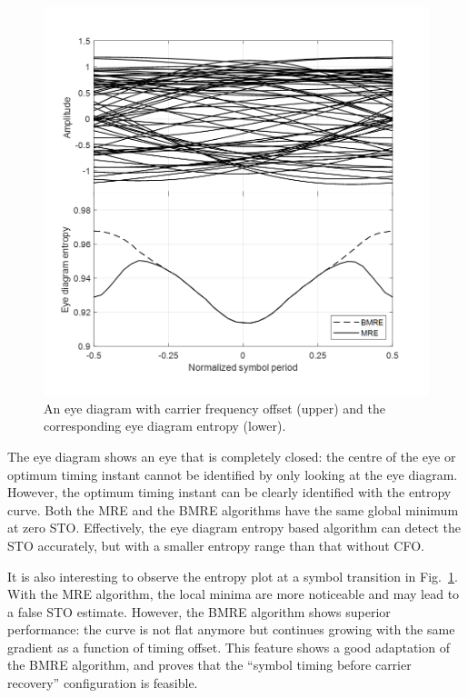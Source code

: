 \documentclass[12pt, draftclsnofoot, onecolumn]{IEEEtran}
\begin{document}
\begin{figure}[ht]
\centering
\includegraphics[width=3.1 in]{pic/timing_freq.png}
\caption{An eye diagram with carrier frequency offset (upper) and the corresponding eye diagram entropy (lower).}
\label{fig:timing_freq} 
\end{figure}

The eye diagram shows an eye that is completely closed: the centre of the eye or optimum timing instant cannot be identified by only looking at the eye diagram.
However, the optimum timing instant can be clearly identified with the entropy curve.
Both the MRE and the BMRE algorithms have the same global minimum at zero STO. 
Effectively, the eye diagram entropy based algorithm can detect the STO accurately,
but with a smaller entropy range than that without CFO.

It is also interesting to observe the entropy plot at a symbol transition in Fig.~\ref{fig:timing_freq}.
With the MRE algorithm, the local minima are more noticeable and may lead to a false STO estimate.
However, the BMRE algorithm shows superior performance:
the curve is not flat anymore but continues growing with the same gradient as a function of timing offset.
This feature shows a good adaptation of the BMRE algorithm, and proves that the ``symbol timing before carrier recovery'' configuration is feasible.
\end{document}
